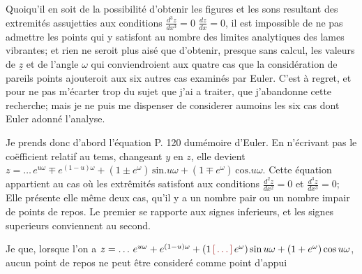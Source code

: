 \documentclass[11pt,a4paper]{article}
\begin{document}

Quoiqu'il en soit de la possibilité d'obtenir les figures et les
sons resultant des extremités assujetties aux conditions $\frac{d^3z}{dx^3}=0$ $\frac{dz}{dx}=0$,
il est impossible de ne pas admettre les points qui y satisfont
au nombre des limites analytiques des lames vibrantes; et rien
ne seroit plus aisé que d'obtenir, presque sans calcul, les valeurs
de $\underline{z}$ et de l'angle $\omega$ qui conviendroient aux quatre cas
que la considération de pareils points ajouteroit aux six
autres cas examinés par Euler. C'est à regret, et pour ne pas
m'écarter trop du sujet que j'ai a traiter, que j'abandonne
cette recherche; mais je ne puis me dispenser de considerer
aumoins les six cas dont Euler adonné l'analyse.

Je prends donc d'abord l'équation P. 120 dumémoire d'Euler.
En n'écrivant pas le coëfficient relatif au tems,  changeant $y$ en
$z$, elle devient $z = \ldots\, e^{u\omega} \mp e^{(1-u)\omega} + (1\pm e^{\omega})\,\text{sin}.u\omega + (1\mp e^{\omega})\,\text{cos}.u\omega$.
Cette équation appartient au cas où les extrêmités satisfont
aux conditions $\frac{d^2z}{dx^2}=0$ et $\frac{d^3z}{dx^3}=0$; Elle présente elle même deux
cas,   qu'il y a un nombre pair ou un nombre
impair de points de repos. Le premier se rapporte aux
signes inferieurs, et les signes superieurs conviennent au second.

Je   que, lorsque l'on a
$z = \ldots\, e^{u\omega} + e^{(1-u)\omega} + (1\,\ill{}\,e^{\omega})\,\text{sin}\,u\omega + (1+e^{\omega})\,\text{cos}\,u\omega$, aucun point
de repos ne peut être consideré comme point d'appui
\end{document}
